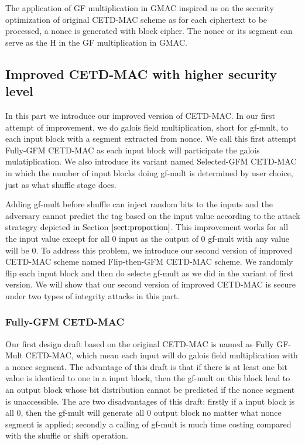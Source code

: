 The application of GF multiplication in GMAC inspired us on the security
optimization of original CETD-MAC scheme as for each ciphertext to be processed,
a nonce is generated with block cipher. The nonce or its segment can serve as
the H in the GF multiplication in GMAC. 
\subsection{Improved CETD-MAC with higher security level}
In this part we introduce our improved version of CETD-MAC. In our first attempt
of improvement, we do galois field multiplication, short for gf-mult, to each input block with a
segment extracted from nonce. We call this first attempt Fully-GFM CETD-MAC as
each input block will participate the galois mulatiplication. We also introduce
its variant named Selected-GFM CETD-MAC in which the number of input blocks
doing gf-mult is determined by user choice, just as what shuffle stage does. 

Adding gf-mult before shuffle can inject random bits to the inputs and the
adversary cannot predict the tag based on the input value according to the
attack strategry depicted in Section $\ref{sect:proportion}$. This improvement works for all
the input value except for all 0 input as the output of 0 gf-mult with any value
will be 0. To address this problem, we introduce our second version of improved
CETD-MAC scheme named Flip-then-GFM CETD-MAC scheme. We randomly flip each input
block and then do selecte gf-mult as we did in the variant of first version. We
will show that our second version of improved CETD-MAC is secure under two types
of integrity attacks in this part. 
\subsubsection{Fully-GFM CETD-MAC}
Our first design draft based on the original CETD-MAC is named as Fully GF-Mult CETD-MAC, which mean each
input will do galois field multiplication with a nonce segment. The advantage of this draft is that if there is at least one bit value is identical to one in a input block, then the gf-mult on this block lead to an output block whose bit distribution cannot be predicted if the nonce segment is unaccessible. 
The are two disadvantages of this draft: firstly if a input block is all 0, then the gf-mult will generate all 0 output block no matter what nonce segment is applied; secondly a calling of gf-mult is much time costing compared with the shuffle or shift operation. 
